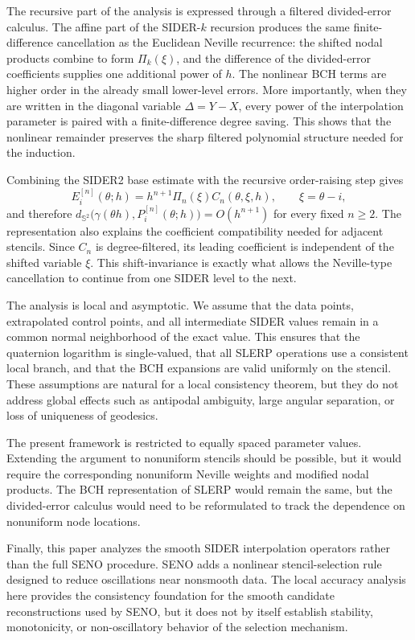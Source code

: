 \documentclass[a4paper,11pt]{article}
\newcommand{\bS}{\mathbb{S}}
\numberwithin{equation}{section}
\theoremstyle{plain}
\theoremstyle{definition}
\theoremstyle{remark}
\begin{document}
The recursive part of the analysis is expressed through a filtered
divided-error calculus.  The affine part of the SIDER-\(k\) recursion produces
the same finite-difference cancellation as the Euclidean Neville recurrence:
the shifted nodal products combine to form \(\Pi_k(\xi)\), and the difference
of the divided-error coefficients supplies one additional power of \(h\).  The
nonlinear BCH terms are higher order in the already small lower-level errors.
More importantly, when they are written in the diagonal variable
\(\Delta=Y-X\), every power of the interpolation parameter is paired with a
finite-difference degree saving.  This shows that the nonlinear remainder
preserves the sharp filtered polynomial structure needed for the induction.

Combining the SIDER2 base estimate with the recursive order-raising step gives
\[
        E_i^{[n]}(\theta;h)
        =
        h^{n+1}\Pi_n(\xi)C_n(\theta,\xi,h),
        \qquad \xi=\theta-i,
\]
and therefore
$
        d_{\bS^2}\bigl(\gamma(\theta h),P_i^{[n]}(\theta;h)\bigr)
        =
        O(h^{n+1})
$
for every fixed \(n\geq2\).  The representation also explains the coefficient
compatibility needed for adjacent stencils.  Since \(C_n\) is degree-filtered,
its leading coefficient is independent of the shifted variable \(\xi\).  This
shift-invariance is exactly what allows the Neville-type cancellation to
continue from one SIDER level to the next.

The analysis is local and asymptotic.  We assume that the data points,
extrapolated control points, and all intermediate SIDER values remain in a
common normal neighborhood of the exact value.  This ensures that the
quaternion logarithm is single-valued, that all SLERP operations use a
consistent local branch, and that the BCH expansions are valid uniformly on
the stencil.  These assumptions are natural for a local consistency theorem,
but they do not address global effects such as antipodal ambiguity, large
angular separation, or loss of uniqueness of geodesics.

The present framework is restricted to equally spaced parameter values.
Extending the argument to nonuniform stencils should be possible, but it would
require the corresponding nonuniform Neville weights and modified nodal
products.  The BCH representation of SLERP would remain the same, but the
divided-error calculus would need to be reformulated to track the dependence
on nonuniform node locations.

Finally, this paper analyzes the smooth SIDER interpolation operators rather
than the full SENO procedure.  SENO adds a nonlinear stencil-selection rule
designed to reduce oscillations near nonsmooth data.  The local accuracy
analysis here provides the consistency foundation for the smooth candidate
reconstructions used by SENO, but it does not by itself establish stability,
monotonicity, or non-oscillatory behavior of the selection mechanism.
\end{document}
